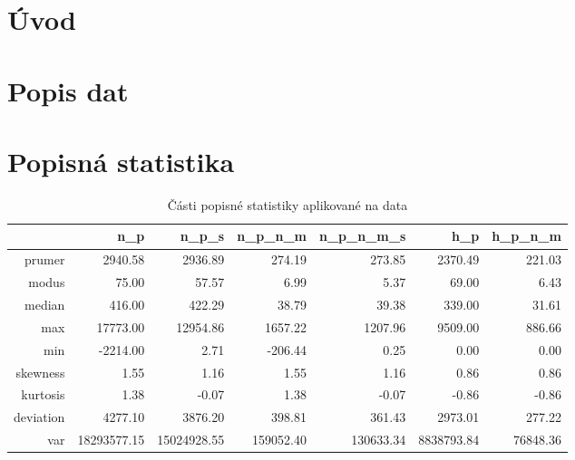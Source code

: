 \documentclass[a4paper]{ article}
\begin{document}



\titulniStrana
\generujObsah			%
\generujSeznamObrazku		%
\generujSeznamTabulek		%



\clearpage
\pagestyle{plain}		%
 {}
\section*{Úvod}
\label{uvod}





\section{Popis dat}

\section{Popisná statistika}
\begin{table}[ht]
\centering
\begin{tabular}{rrrrrrr}
  \hline
 & n\_p & n\_p\_s & n\_p\_n\_m & n\_p\_n\_m\_s & h\_p & h\_p\_n\_m \\ 
  \hline
prumer & 2940.58 & 2936.89 & 274.19 & 273.85 & 2370.49 & 221.03 \\ 
  modus & 75.00 & 57.57 & 6.99 & 5.37 & 69.00 & 6.43 \\ 
  median & 416.00 & 422.29 & 38.79 & 39.38 & 339.00 & 31.61 \\ 
  max & 17773.00 & 12954.86 & 1657.22 & 1207.96 & 9509.00 & 886.66 \\ 
  min & -2214.00 & 2.71 & -206.44 & 0.25 & 0.00 & 0.00 \\ 
  skewness & 1.55 & 1.16 & 1.55 & 1.16 & 0.86 & 0.86 \\ 
  kurtosis & 1.38 & -0.07 & 1.38 & -0.07 & -0.86 & -0.86 \\ 
  deviation & 4277.10 & 3876.20 & 398.81 & 361.43 & 2973.01 & 277.22 \\ 
  var & 18293577.15 & 15024928.55 & 159052.40 & 130633.34 & 8838793.84 & 76848.36 \\ 
   \hline
\end{tabular}
\caption{Části popisné statistiky aplikované na data} 
\label{table:popisStat}
\end{table}\clearpage
\end{document}
